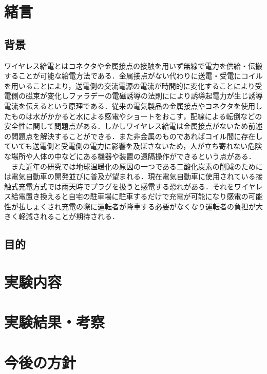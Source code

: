 \documentclass[10pt,a4paper,twocolumn]{jarticle}
\begin{document}
\section{緒言}
\subsection{背景}
ワイヤレス給電とはコネクタや金属接点の接触を用いず無線で電力を供給・伝搬することが可能な給電方法である．金属接点がない代わりに送電・受電にコイルを用いることにより，送電側の交流電源の電流が時間的に変化することにより受電側の磁束が変化しファラデーの電磁誘導の法則ににより誘導起電力が生じ誘導電流を伝えるという原理である．従来の電気製品の金属接点やコネクタを使用したものは水がかかると水による感電やショートをおこす，配線による転倒などの安全性に関して問題点がある．しかしワイヤレス給電は金属接点がないため前述の問題点を解決することができる．また非金属のものであればコイル間に存在していても送電側と受電側の電力に影響を及ぼさないため，人が立ち寄れない危険な場所や人体の中などにある機器や装置の遠隔操作ができるという点がある．\\　また近年の研究では地球温暖化の原因の一つである二酸化炭素の削減のためには電気自動車の開発並びに普及が望まれる．現在電気自動車に使用されている接触式充電方式では雨天時でプラグを扱うと感電する恐れがある．それをワイヤレス給電置き換えると自宅の駐車場に駐車するだけで充電が可能になり感電の可能性が払しょくされ充電の際に運転者が降車する必要がなくなり運転者の負担が大きく軽減されることが期待される．
\subsection{目的}
\section{実験内容}
\section{実験結果・考察}
\section{今後の方針}
\end{document}
